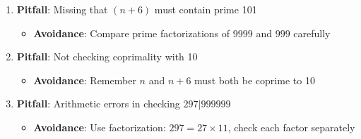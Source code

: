 \documentclass[11pt]{article}
\begin{document}
\begin{roadmapbox}
\begin{enumerate}[leftmargin=*]
    \item \textbf{Pitfall}: Missing that $(n+6)$ must contain prime 101
    \begin{itemize}
        \item \textbf{Avoidance}: Compare prime factorizations of $9999$ and $999$ carefully
    \end{itemize}
    
    \item \textbf{Pitfall}: Not checking coprimality with 10
    \begin{itemize}
        \item \textbf{Avoidance}: Remember $n$ and $n+6$ must both be coprime to 10
    \end{itemize}
    
    \item \textbf{Pitfall}: Arithmetic errors in checking $297 | 999999$
    \begin{itemize}
        \item \textbf{Avoidance}: Use factorization: $297 = 27 \times 11$, check each factor separately
    \end{itemize}
\end{enumerate}
\end{roadmapbox}
\end{document}
